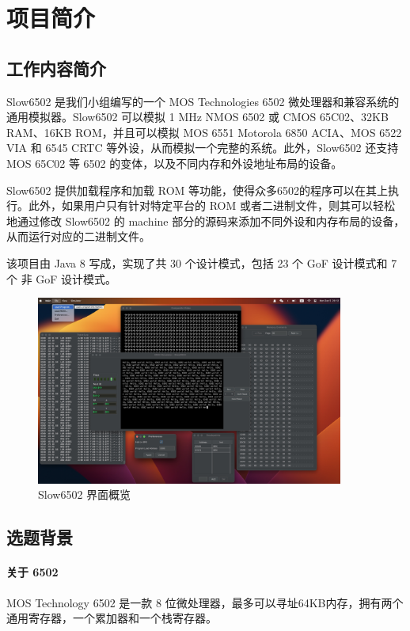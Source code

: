 \newpage

\section{项目简介}

\subsection{工作内容简介}

Slow6502 是我们小组编写的一个 MOS Technologies 6502 微处理器和兼容系统的通用模拟器。Slow6502 可以模拟 1 MHz NMOS 6502 或 CMOS 65C02、32KB RAM、16KB ROM，并且可以模拟 MOS 6551 Motorola 6850 ACIA、MOS 6522 VIA 和 6545 CRTC 等外设，从而模拟一个完整的系统。此外，Slow6502 还支持 MOS 65C02 等 6502 的变体，以及不同内存和外设地址布局的设备。

Slow6502 提供加载程序和加载 ROM 等功能，使得众多6502的程序可以在其上执行。此外，如果用户只有针对特定平台的 ROM 或者二进制文件，则其可以轻松地通过修改 Slow6502 的 machine 部分的源码来添加不同外设和内存布局的设备，从而运行对应的二进制文件。

该项目由 Java 8 写成，实现了共 30 个设计模式，包括 23 个 GoF 设计模式和 7 个 非 GoF 设计模式。

\begin{figure}[H]
  \centering
  \includegraphics[width=0.9\textwidth]{image/Slow6502UI.jpg}
  \caption{Slow6502 界面概览}
\end{figure}

\newpage
\subsection{选题背景}

\paragraph{关于 6502} MOS Technology 6502 是一款 8 位微处理器，最多可以寻址64KB内存，拥有两个通用寄存器，一个累加器和一个栈寄存器。


